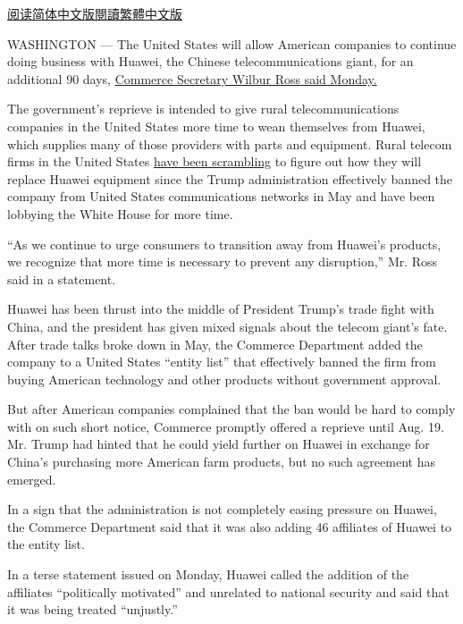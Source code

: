 \href{https://cn.nytimes.com/usa/20190820/huawei-trump/}{阅读简体中文版}\href{https://cn.nytimes.com/usa/20190820/huawei-trump/zh-hant/}{閱讀繁體中文版}

WASHINGTON --- The United States will allow American companies to
continue doing business with Huawei, the Chinese telecommunications
giant, for an additional 90 days,
\href{https://twitter.com/MariaBartiromo?ref_src=twsrc\%5Egoogle\%7Ctwcamp\%5Eserp\%7Ctwgr\%5Eauthor}{Commerce
Secretary Wilbur Ross said Monday.}

The government's reprieve is intended to give rural telecommunications
companies in the United States more time to wean themselves from Huawei,
which supplies many of those providers with parts and equipment. Rural
telecom firms in the United States
\href{https://www.nytimes.com/2019/05/25/technology/huawei-rural-wireless-service.html}{have
been scrambling} to figure out how they will replace Huawei equipment
since the Trump administration effectively banned the company from
United States communications networks in May and have been lobbying the
White House for more time.

``As we continue to urge consumers to transition away from Huawei's
products, we recognize that more time is necessary to prevent any
disruption,'' Mr. Ross said in a statement.

Huawei has been thrust into the middle of President Trump's trade fight
with China, and the president has given mixed signals about the telecom
giant's fate. After trade talks broke down in May, the Commerce
Department added the company to a United States ``entity list'' that
effectively banned the firm from buying American technology and other
products without government approval.

But after American companies complained that the ban would be hard to
comply with on such short notice, Commerce promptly offered a reprieve
until Aug. 19. Mr. Trump had hinted that he could yield further on
Huawei in exchange for China's purchasing more American farm products,
but no such agreement has emerged.

In a sign that the administration is not completely easing pressure on
Huawei, the Commerce Department said that it was also adding 46
affiliates of Huawei to the entity list.

In a terse statement issued on Monday, Huawei called the addition of the
affiliates ``politically motivated'' and unrelated to national security
and said that it was being treated ``unjustly.''

